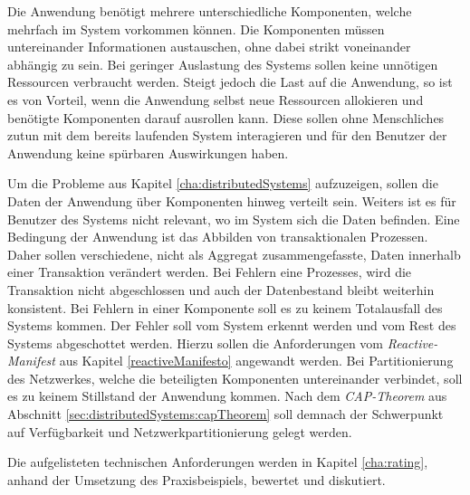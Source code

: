 \begin{enumerate}
  Die Anwendung benötigt mehrere unterschiedliche Komponenten, welche mehrfach im System vorkommen können. Die Komponenten müssen untereinander Informationen austauschen, ohne dabei strikt voneinander abhängig zu sein.
  Bei geringer Auslastung des Systems sollen keine unnötigen Ressourcen verbraucht werden. Steigt jedoch die Last auf die Anwendung, so ist es von Vorteil, wenn die Anwendung selbst neue Ressourcen allokieren und benötigte Komponenten darauf ausrollen kann. Diese sollen ohne Menschliches zutun mit dem bereits laufenden System interagieren und für den Benutzer der Anwendung keine spürbaren Auswirkungen haben.

  Um die Probleme aus Kapitel \ref{cha:distributedSystems} aufzuzeigen, sollen die Daten der Anwendung über Komponenten hinweg verteilt sein. Weiters ist es für Benutzer des Systems nicht relevant, wo im System sich die Daten befinden. 
  Eine Bedingung der Anwendung ist das Abbilden von transaktionalen Prozessen. Daher sollen verschiedene, nicht als Aggregat zusammengefasste, Daten innerhalb einer Transaktion verändert werden. Bei Fehlern eine Prozesses, wird die Transaktion nicht abgeschlossen und auch der Datenbestand bleibt weiterhin konsistent.
  Bei Fehlern in einer Komponente soll es zu keinem Totalausfall des Systems kommen. Der Fehler soll vom System erkennt werden und vom Rest des Systems abgeschottet werden. Hierzu sollen die Anforderungen vom \textit{Reactive-Manifest} aus Kapitel \ref{reactiveManifesto} angewandt werden.
  Bei Partitionierung des Netzwerkes, welche die beteiligten Komponenten untereinander verbindet, soll es zu keinem Stillstand der Anwendung kommen. Nach dem \textit{CAP-Theorem} aus Abschnitt \ref{sec:distributedSystems:capTheorem} soll demnach der Schwerpunkt auf Verfügbarkeit und Netzwerkpartitionierung gelegt werden. 
\end{enumerate}
Die aufgelisteten technischen Anforderungen werden in Kapitel \ref{cha:rating}, anhand der Umsetzung des Praxisbeispiels, bewertet und diskutiert. 

